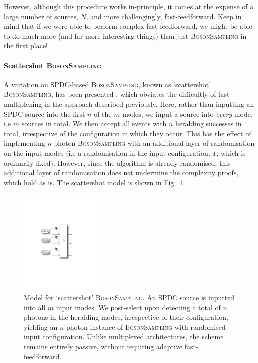 However, although this procedure works in-principle, it comes at the expense of a large number of sources, $N$, and more challengingly, fast-feedforward. Keep in mind that if we were able to perform complex fast-feedforward, we might be able to do much more (and far more interesting things) than just \textsc{BosonSampling} in the first place!

%
%

\paragraph{Scattershot \textsc{BosonSampling}} 

A variation on SPDC-based \textsc{BosonSampling}, known as `scattershot' \textsc{BosonSampling}, has been presented \cite{bib:RandBS}, which obviates the difficultly of fast multiplexing in the approach described previously. Here, rather than inputting an SPDC source into the first $n$ of the $m$ modes, we input a source into \textit{every} mode, i.e $m$ sources in total. We then accept all events with $n$ heralding successes in total, irrespective of the configuration in which they occur. This has the effect of implementing $n$-photon \textsc{BosonSampling} with an additional layer of randomisation on the input modes (i.e a randomisation in the input configuration, $T$, which is ordinarily fixed). However, since the algorithm is already randomised, this additional layer of randomisation does not undermine the complexity proofs, which hold as is. The scattershot model is shown in Fig.~\ref{fig:scattershot_model}.

\begin{figure}[!htbp]
\includegraphics[clip=true, width=0.35\textwidth]{scattershot_model}
\captionspacefig \caption{Model for `scattershot' \textsc{BosonSampling}. An SPDC source is inputted into all $m$ input modes. We post-select upon detecting a total of $n$ photons in the heralding modes, irrespective of their configuration, yielding an $n$-photon instance of \textsc{BosonSampling} with randomised input configuration. Unlike multiplexed architectures, the scheme remains entirely passive, without requiring adaptive fast-feedforward.} \label{fig:scattershot_model}
\end{figure}

